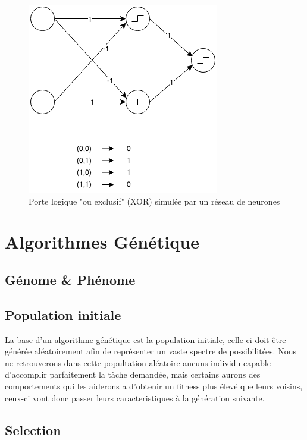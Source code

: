 \documentclass{article}
\begin{document}
\begin{figure}[h]
\begin{center}
	\includegraphics[scale=0.7]{xor.png} 
	\caption{Porte logique "ou exclusif" (XOR) simulée par un réseau de neurones}
\end{center}
\end{figure}

\section{Algorithmes Génétique}



\subsection{Génome \& Phénome}

\subsection{Population initiale}

La base d'un algorithme génétique est la population initiale, celle ci doit être générée aléatoirement afin de représenter un vaste spectre de possibilitées. 
Nous ne retrouverons dans cette popultation aléatoire aucuns individu capable d'accomplir parfaitement la tâche demandée, mais certains aurons des comportements qui les aiderons a d'obtenir un fitness plus élevé que leurs voisins, ceux-ci vont donc passer leurs caracteristiques à la génération suivante.

\subsection{Selection}
\end{document}
